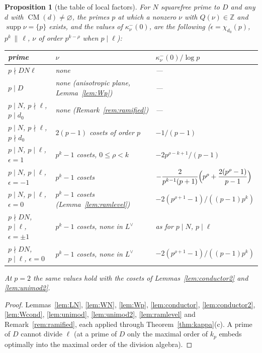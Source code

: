 \documentclass[11pt,reqno]{amsart}
\theoremstyle{plain}
\newtheorem{proposition}[theorem]{Proposition}
\theoremstyle{definition}
\DeclareMathOperator{\supp}{supp}
\DeclareMathOperator{\CM}{CM}
\newcommand{\Z}{\mathbb{Z}}
\newcommand{\Ldual}{L^{\vee}}
\begin{document}
\begin{proposition}[the table of local factors]\label{prop:table}
For $N$ squarefree prime to $D$ and any $d$ with $\CM(d)\neq\varnothing$, the primes $p$ at which
a nonzero $\nu$ with $Q(\nu)\in\Z$ and $\supp\nu=\{p\}$ exists, and the values of $\kappa^-_\nu(0)$,
are the following ($\epsilon=\chi_{d_0}(p)$, $p^k\,\|\,\ell$, $\nu$ of order $p^{k-\rho}$ when $p\mid\ell$):
\begin{center}\small
\begin{tabular}{lll}
\toprule
prime & $\nu$ & $\kappa^-_\nu(0)/\log p$\\
\midrule
$p\nmid DN\ell$ & none & ---\\
$p\mid D$ & none (anisotropic plane, Lemma~\ref{lem:Wp}) & ---\\
$p\mid N$, $p\nmid\ell$, $p\mid d_0$ & none (Remark~\ref{rem:ramified}) & ---\\
$p\mid N$, $p\nmid\ell$, $p\nmid d_0$ & $2(p-1)$ cosets of order $p$ & $-1/(p-1)$\\
$p\mid N$, $p\mid\ell$, $\epsilon=1$ & $p^k-1$ cosets, $0\le\rho<k$ & $-2p^{\rho-k+1}/(p-1)$\\
$p\mid N$, $p\mid\ell$, $\epsilon=-1$ & $p^k-1$ cosets & $-\dfrac{2}{p^{k-1}(p+1)}\Bigl(p^\rho+\dfrac{2(p^\rho-1)}{p-1}\Bigr)$\\
$p\mid N$, $p\mid\ell$, $\epsilon=0$ & $p^k-1$ cosets (Lemma~\ref{lem:ramlevel}) & $-2(p^{\rho+1}-1)/((p-1)p^k)$\\
$p\nmid DN$, $p\mid\ell$, $\epsilon=\pm1$ & $p^k-1$ cosets, none in $\Ldual$ & as for $p\mid N$, $p\mid\ell$\\
$p\nmid DN$, $p\mid\ell$, $\epsilon=0$ & $p^k-1$ cosets, none in $\Ldual$ & $-2(p^{\rho+1}-1)/((p-1)p^k)$\\
\bottomrule
\end{tabular}
\end{center}
At $p=2$ the same values hold with the cosets of Lemmas~\ref{lem:conductor2} and \ref{lem:unimod2}.
\end{proposition}
\begin{proof}
Lemmas~\ref{lem:LN}, \ref{lem:WN}, \ref{lem:Wp}, \ref{lem:conductor}, \ref{lem:conductor2},
\ref{lem:Wcond}, \ref{lem:unimod}, \ref{lem:unimod2}, \ref{lem:ramlevel} and
Remark~\ref{rem:ramified}, each applied through Theorem~\ref{thm:kappa}(c). A prime of $D$ cannot
divide $\ell$ (at a prime of $D$ only the maximal order of $k_p$ embeds optimally into the maximal
order of the division algebra).
\end{proof}
\end{document}
